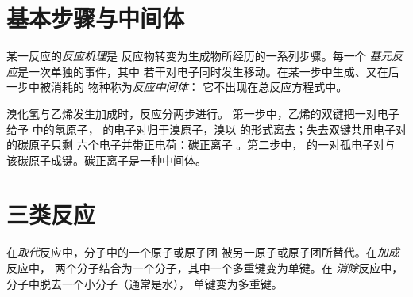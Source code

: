 \section{基本步骤与中间体}

\begin{definition}\label{def:g12:curly-arrows:mechanism}
某一反应的\emph{反应机理}是
反应物转变为生成物所经历的一系列步骤。每一个
\emph{基元反应}是一次单独的事件，其中
若干对电子同时发生移动。在某一步中生成、又在后一步中被消耗的
物种称为\emph{反应中间体}：
它不出现在总反应方程式中。
\end{definition}


\begin{example}[碳正离子中间体]\label{ex:g12:curly-arrows:carbocation}
溴化氢与乙烯发生加成时，反应分两步进行。
第一步中，乙烯的双键把一对电子给予
 中的氢原子， 的电子对归于溴原子，溴以
 的形式离去；失去双键共用电子对的碳原子只剩
六个电子并带正电荷：碳正离子
。第二步中， 的一对孤电子对与
该碳原子成键。碳正离子是一种中间体。
\end{example}

\section{三类反应}

\begin{definition}[取代、加成、消除]\label{def:g12:curly-arrows:categories}
在\emph{取代}反应中，分子中的一个原子或原子团
被另一原子或原子团所替代。在\emph{加成}反应中，
两个分子结合为一个分子，其中一个多重键变为单键。在
\emph{消除}反应中，分子中脱去一个小分子（通常是水），
单键变为多重键。
\end{definition}

